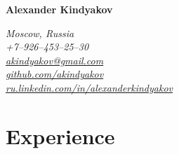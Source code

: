 \documentclass[a4paper, 10pt]{article}
\begin{document}
{\Large\textbf{Alexander Kindyakov}}

\begin{flushright}
    {\itshape
        Moscow, Russia \\
        +7--926--453--25--30 \\
        \href{mailto:akindyakov@gmail.com}{akindyakov@gmail.com} \\
        \href{https://github.com/akindyakov}{github.com/akindyakov} \\
        \href{http://ru.linkedin.com/in/alexanderkindyakov}{ru.linkedin.com/in/alexanderkindyakov} \\
    }
\end{flushright}


\section{Experience}
\end{document}
